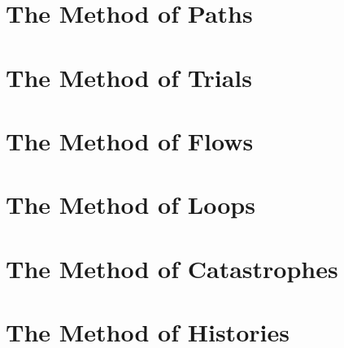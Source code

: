 \documentclass{antiquebook}
\begin{document}
    \section{The Method of Paths}
    
    \section{The Method of Trials}
    
    \section{The Method of Flows}
    
    \section{The Method of Loops}
    
    \section{The Method of Catastrophes}
    
    \section{The Method of Histories}
\end{document}
